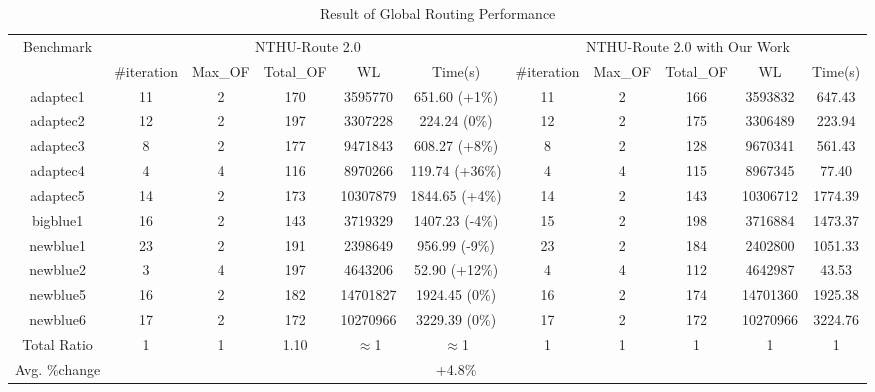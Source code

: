 \begin{table*}[htbp]
\caption{Result of Global Routing Performance}
\begin{center}
\begin{tabular}{|c|c|c|c|c|c|c|c|c|c|c|}
\hline
\multirow{2}{*}{Benchmark} & \multicolumn{5}{c|}{NTHU-Route 2.0}                           & \multicolumn{5}{c|}{NTHU-Route 2.0 with Our Work}      \\ \cline{2-11} 
                           & \#iteration & Max\_OF & Total\_OF & WL       & Time(s)        & \#iteration & Max\_OF & Total\_OF & WL       & Time(s) \\ \hline
adaptec1                   & 11          & 2       & 170       & 3595770  & 651.60 (+1\%)  & 11          & 2       & 166       & 3593832  & 647.43  \\ \hline
adaptec2                   & 12          & 2       & 197       & 3307228  & 224.24 (0\%)   & 12          & 2       & 175       & 3306489  & 223.94  \\ \hline
adaptec3                   & 8           & 2       & 177       & 9471843  & 608.27 (+8\%)  & 8           & 2       & 128       & 9670341  & 561.43  \\ \hline
adaptec4                   & 4           & 4       & 116       & 8970266  & 119.74 (+36\%) & 4           & 4       & 115       & 8967345  & 77.40   \\ \hline
adaptec5                   & 14          & 2       & 173       & 10307879 & 1844.65 (+4\%) & 14          & 2       & 143       & 10306712 & 1774.39 \\ \hline
bigblue1                   & 16          & 2       & 143       & 3719329  & 1407.23 (-4\%) & 15          & 2       & 198       & 3716884  & 1473.37 \\ \hline
newblue1                   & 23          & 2       & 191       & 2398649  & 956.99 (-9\%)  & 23          & 2       & 184       & 2402800  & 1051.33 \\ \hline
newblue2                   & 3           & 4       & 197       & 4643206  & 52.90 (+12\%)  & 4           & 4       & 112       & 4642987  & 43.53   \\ \hline
newblue5                   & 16          & 2       & 182       & 14701827 & 1924.45 (0\%)  & 16          & 2       & 174       & 14701360 & 1925.38 \\ \hline
newblue6                   & 17          & 2       & 172       & 10270966 & 3229.39 (0\%)  & 17          & 2       & 172       & 10270966 & 3224.76 \\ \hline
Total Ratio                & 1           & 1       & 1.10      & $\approx$1     & $\approx$1           & 1           & 1       & 1         & 1        & 1       \\ \hline
Avg. \%change              &             &         &           &          & +4.8\%         &             &         &           &          &         \\ \hline
\end{tabular}
\label{tab:gr}
\end{center}
\end{table*}